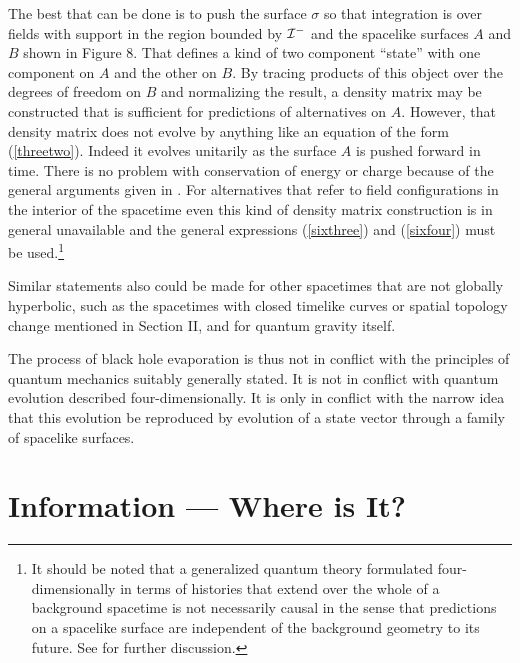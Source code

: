 The best that can be done is to push the surface $\sigma$ so that
integration is over fields with support in the region bounded by
${\cal I}^-$ and the spacelike surfaces $A$ and $B$ shown in  Figure 8. 
That defines a kind of two component
``state'' with one component on $A$ and the other on $B$. By tracing
products of this object over the degrees of freedom on $B$ and 
normalizing the result, a density
matrix may be constructed that is sufficient for predictions of 
alternatives on $A$.
However, that density matrix does not evolve by anything like an 
equation of the form 
(\ref{threetwo}). Indeed it evolves unitarily as the surface
$A$ is pushed forward in time.  There is no problem with
conservation of energy or charge because of the
general arguments given in \cite{HLM95}. For alternatives
that refer to field configurations in the interior of the spacetime
even this kind of density matrix construction is in general unavailable
and the general expressions (\ref{sixthree}) and (\ref{sixfour}) must
be used.\footnote{It should be noted that a generalized quantum 
theory  formulated four-dimensionally in terms of histories that
extend over the whole of a background spacetime is not necessarily 
causal in the sense that predictions on a spacelike surface are
independent of the background geometry to its future. See
\cite{Har95a,And95,RosZZ} for further discussion.}


Similar statements also could be made  for other spacetimes that are not
globally hyperbolic, such as the spacetimes with closed timelike curves
or spatial topology change
mentioned in Section II, and for quantum gravity itself.

The process of black hole evaporation is thus not in conflict with the
principles of quantum mechanics suitably generally stated.  It is not in
conflict with quantum evolution described four-dimensionally.  It is
only in conflict with the narrow idea that this evolution be reproduced
by evolution of a state vector through a family of spacelike surfaces.


\section{Information --- Where is It?}

